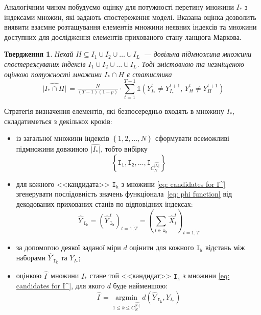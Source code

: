 \documentclass[]{iptconf}
\DeclareMathOperator*{\argmin}{argmin}
\theoremstyle{plain}
\newtheorem{claim}{\indent Твердження}
\begin{document}
Аналогічним чином побудуємо оцінку для потужності перетину множини $I_*$ з індексами множин, які задають спостереження моделі. Вказана оцінка дозволить виявити взаємне розташування елементів множини неявних індексів та множини доступних для дослідження елементів прихованого стану ланцюга Маркова.

\begin{claim}
    Нехай $H \subseteq I_1 \cup I_2 \cup \ldots \cup I_L$~--- довільна підмножина множини спостережуваних індексів $I_1 \cup I_2 \cup \ldots \cup I_L$. Тоді змістовною та незміщеною оцінкою потужності множини $I_* \cap H$ є статистика
    \begin{equation}\label{eq: ||I* cup H|| estimation}
        \widehat{\,|I_* \cap H|\,} = \tfrac{N}{(T-1)(1-p)} \cdot \sum_{t=1}^{T-1}\mathbb{1} \left( Y^t_{I_*} \neq Y^{t+1}_{I_*},\, Y^t_H \neq Y^{t+1}_H \right)
    \end{equation}
\end{claim}

Стратегія визначення елементів, які безпосередньо входять в множину $I_*$, складатиметься з декількох кроків:
\begin{itemize}
    \item із загальної множини індексів $\left\{ 1,2,\ldots,N \right\}$ сформувати всеможливі підмножини довжиною $\widehat{|I_*|}$, тобто вибірку 
    \begin{equation}\label{eq: candidates for I^}
        \left\{ \mathtt{I_1},\mathtt{I_2},\ldots,\mathtt{I}_{C^{\widehat{|I_*|}}_N} \right\}
    \end{equation}
    \item для кожного <<кандидата>> $\mathtt{I_k}$ з множини \eqref{eq: candidates for I^} згенерувати послідовність значень функціонала~\eqref{eq: phi function} від декодованих прихованих станів по відповідних індексах:
    \begin{equation*}
        \widehat{Y\,}_{\mathtt{I_k}} = \left( \widehat{Y\,}^t_{\mathtt{I_k}} \right)_{t=\overline{1,T}} = \left( \sum_{i \in \mathtt{I_k}} \widehat{X}^t_i \right)_{t=\overline{1,T}}
    \end{equation*}
    \item за допомогою деякої заданої міри $d$ оцінити для кожного $\mathtt{I_k}$ відстань між наборами $\widehat{Y\,}_{\mathtt{I_k}}$ та $Y_{I_*}$;
    \item оцінкою $\widehat{I\,}$ множини $I_*$ стане той <<кандидат>> $\mathtt{I_k}$ з множини \eqref{eq: candidates for I^}, для якого $d$ буде найменшою:
    \begin{equation}\label{eq: I^ estimation}
        \widehat{I\,} = \argmin\limits_{1\leqslant k \leqslant C^{\widehat{|I_*|}}_N}{d\left( \widehat{Y\,}_{\mathtt{I_k}}, Y_{I_*} \right)}
    \end{equation}
\end{itemize}
\end{document}
